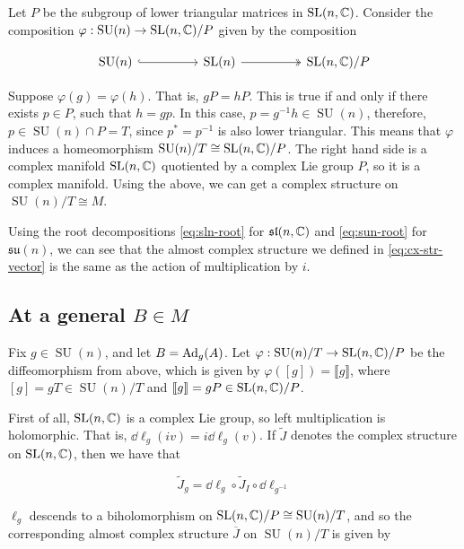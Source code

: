 \documentclass{article}
\DeclareMathOperator{\SU}{SU}
\newcommand{\su}{\mathfrak{su}}
\renewcommand{\sl}{\mathfrak{sl}}
\renewcommand{\tilde}{\widetilde}
\begin{document}
\label{sec:cx-quot}

Let \(P\) be the subgroup of lower triangular matrices in \(\operatorname{SL}(n, \mathbb{C})\). Consider the composition \(\varphi : \SU(n) \to \SL(n, \C)/P\) given by the composition 

\[\begin{tikzcd}
	{\SU(n)} && {\SL(n)} && {\SL(n, \C)/P}
	\arrow[hook, from=1-1, to=1-3]
	\arrow[two heads, from=1-3, to=1-5]
\end{tikzcd}\]

Suppose \(\varphi(g) = \varphi(h)\). That is, \(gP = hP\). This is true if and only if there exists \(p \in P\), such that \(h = gp\). In this case, \(p = g^{-1}h \in \SU(n)\), therefore, \(p \in \SU(n) \cap P = T\), since \(p^* = p^{-1}\) is also lower triangular. This means that \(\varphi\) induces a homeomorphism \(\SU(n)/T \cong \SL(n, \C)/P\). The right hand side is a complex manifold \(\operatorname{SL}(n, \mathbb{C})\) quotiented by a complex Lie group \(P\), so it is a complex manifold. Using the above, we can get a complex structure on \(\SU(n)/T \cong M\).

Using the root decompositions \cref{eq:sln-root} for \(\sl(n, \C)\) and \cref{eq:sun-root} for \(\su(n)\), we can see that the almost complex structure we defined in \cref{eq:cx-str-vector} is the same as the action of multiplication by \(i\).

\subsection{At a general \(B \in M\)}

Fix \(g \in \SU(n)\), and let \(B = \operatorname{Ad}_g(A)\). Let \(\varphi : \SU(n)/T \to \SL(n, \C)/P\) be the diffeomorphism from above, which is given by \(\varphi([g]) = \llbracket g\rrbracket\), where \([g] = gT \in \SU(n)/T\) and \(\llbracket g \rrbracket = gP \in \operatorname{SL}(n, \mathbb{C})/P\).

First of all, \(\operatorname{SL}(n, \mathbb{C})\) is a complex Lie group, so left multiplication is holomorphic. That is, \(\dd \ell_g(iv) = i\dd\ell_g(v)\). If \(\tilde J\) denotes the complex structure on \(\operatorname{SL}(n, \mathbb{C})\), then we have that

\[\tilde J_g = \dd \ell_g \circ \tilde J_I \circ \dd\ell_{g^{-1}}\]

\(\ell_g\) descends to a biholomorphism on \(\SL(n, \C)/P \cong \SU(n)/T\), and so the corresponding almost complex structure \(\overline J\) on \(\SU(n)/T\) is given by
\end{document}
